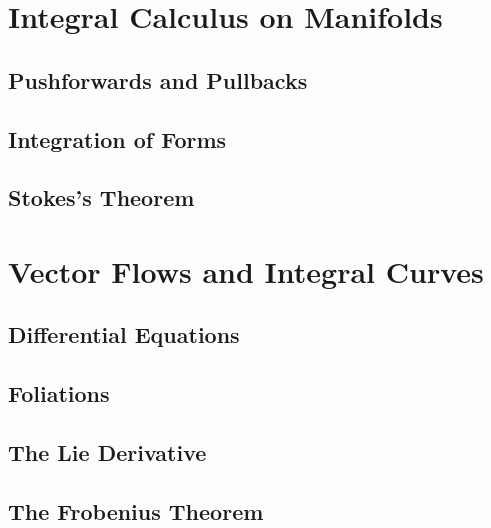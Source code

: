 \documentclass[oneside,english]{amsbook}
\numberwithin{section}{chapter}
\theoremstyle{plain}
\theoremstyle{definition}
\begin{document}
	\chapter{Integral Calculus on Manifolds}

		\section{Pushforwards and Pullbacks}
		\section{Integration of Forms}
		\section{Stokes's Theorem}


	\chapter{Vector Flows and Integral Curves}
	
		\section{Differential Equations}

		\section{Foliations}

		\section{The Lie Derivative}
	
		\section{The Frobenius Theorem}
\end{document}
